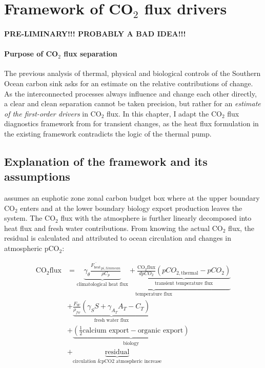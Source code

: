  
\clearpage
\section{Framework of CO$_2$ flux drivers}
\label{ch:CO2fluxseparation}
\paragraph{PRE-LIMINARY!!! PROBABLY A BAD IDEA!!!}

\paragraph{Purpose of CO$_2$ flux separation}
The previous analysis of thermal, physical and biological controls of the Southern Ocean carbon sink asks for an estimate on the relative contributions of change. As the interconnected processes always influence and change each other directly, a clear and clean separation cannot be taken precision, but rather for an \textit{estimate of the first-order drivers} in CO$_2$ flux. In this chapter, I adapt the CO$_2$ flux diagnostics framework from \cite{Lauderdale2016a} for transient changes, as the heat flux formulation in the existing framework contradicts the logic of the thermal pump.

\subsection{Explanation of the framework and its assumptions}
\cite{Lauderdale2016a} assumes an euphotic zone zonal carbon budget box where at the upper boundary CO$_2$ enters and at the lower boundary biology export production leaves the system. The CO$_2$ flux with the atmosphere is further linearly decomposed into heat flux and fresh water contributions. From knowing the actual CO$_2$ flux, the residual is calculated and attributed to ocean circulation and changes in atmospheric pCO$_2$:

\begin{align*}
\text{CO}_2\text{flux}&= 
\underbrace{   \underbrace{    \gamma_\theta \frac{\overline{ F_{\text{heat}}}_{pi,timmean}}{\rho C_p}}_{\text{climatological heat flux}} +\underbrace{\frac{\text{CO}_{2}\text{flux}}{dpCO_2}\left(pCO_{2,\text{thermal}}-pCO_2\right)}_{\text{transient temperature flux}}}_{\text{temperature flux}} \\
&+ \underbrace{\frac{F_W}{\rho_{fw}}\left( \gamma_S S + \gamma_{A_T} A_T-C_T\right)}_{\text{fresh water flux}} \\ 
&+ \underbrace{\left(\frac{1}{2}\text{calcium export}-\text{organic export}\right)}_{\text{biology}}\\
&+\underbrace{\text{residual}}_{\text{circulation \& pCO2 atmospheric increase}}
\end{align*}


